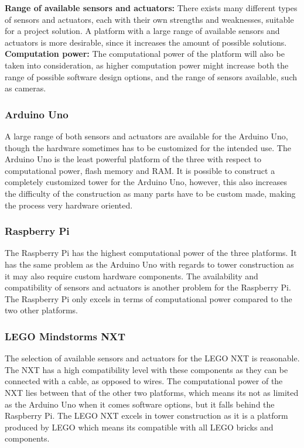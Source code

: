 \textbf{Range of available sensors and actuators:} There exists many different types of sensors and actuators, each with their own strengths and weaknesses, suitable for a project solution. A platform with a large range of available sensors and actuators is more desirable, since it increases the amount of possible solutions. \\

\textbf{Computation power:} The computational power of the platform will also be taken into consideration, as higher computation power might increase both the range of possible software design options, and the range of sensors available, such as cameras. 

%

\subsubsection{Arduino Uno}
A large range of both sensors and actuators are available for the Arduino Uno, though the hardware sometimes has to be customized for the intended use. The Arduino Uno is the least powerful platform of the three with respect to computational power, flash memory and RAM. It is possible to construct a completely customized tower for the Arduino Uno, however, this also increases the difficulty of the construction as many parts have to be custom made, making the process very hardware oriented. 

\subsubsection{Raspberry Pi}
The Raspberry Pi has the highest computational power of the three platforms. It has the same problem as the Arduino Uno with regards to tower construction as it may also require custom hardware components. The availability and compatibility of sensors and actuators is another problem for the Raspberry Pi. The Raspberry Pi only excels in terms of computational power compared to the two other platforms.

\subsubsection{LEGO Mindstorms NXT}
The selection of available sensors and actuators for the LEGO NXT is reasonable. The NXT has a high compatibility level with these components as they can be connected with a cable, as opposed to wires. The computational power of the NXT lies between that of the other two platforms, which means its not as limited as the Arduino Uno when it comes software options, but it falls behind the Raspberry Pi. The LEGO NXT excels in tower construction as it is a platform produced by LEGO which means its compatible with all LEGO bricks and components.

